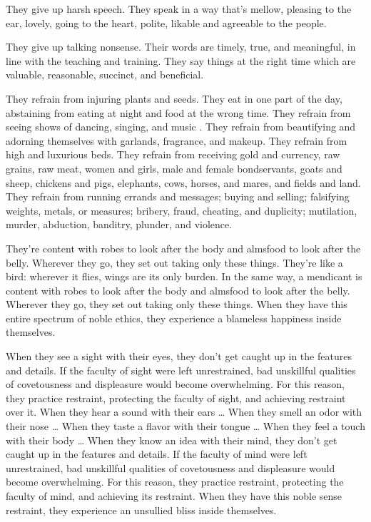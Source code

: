 \documentclass[12pt,openany]{book}%
\begin{document}
They give up harsh speech. They speak in a way that’s mellow, pleasing to the ear, lovely, going to the heart, polite, likable and agreeable to the people. 

They give up talking nonsense. Their words are timely, true, and meaningful, in line with the teaching and training. They say things at the right time which are valuable, reasonable, succinct, and beneficial. 

They refrain from injuring plants and seeds. They eat in one part of the day, abstaining from eating at night and food at the wrong time. They refrain from seeing shows of dancing, singing, and music . They refrain from beautifying and adorning themselves with garlands, fragrance, and makeup. They refrain from high and luxurious beds. They refrain from receiving gold and currency, raw grains, raw meat, women and girls, male and female bondservants, goats and sheep, chickens and pigs, elephants, cows, horses, and mares, and fields and land. They refrain from running errands and messages; buying and selling; falsifying weights, metals, or measures; bribery, fraud, cheating, and duplicity; mutilation, murder, abduction, banditry, plunder, and violence. 

They’re content with robes to look after the body and almsfood to look after the belly. Wherever they go, they set out taking only these things. They’re like a bird: wherever it flies, wings are its only burden. In the same way, a mendicant is content with robes to look after the body and almsfood to look after the belly. Wherever they go, they set out taking only these things. When they have this entire spectrum of noble ethics, they experience a blameless happiness inside themselves. 

When they see a sight with their eyes, they don’t get caught up in the features and details. If the faculty of sight were left unrestrained, bad unskillful qualities of covetousness and displeasure would become overwhelming. For this reason, they practice restraint, protecting the faculty of sight, and achieving restraint over it. When they hear a sound with their ears … When they smell an odor with their nose … When they taste a flavor with their tongue … When they feel a touch with their body … When they know an idea with their mind, they don’t get caught up in the features and details. If the faculty of mind were left unrestrained, bad unskillful qualities of covetousness and displeasure would become overwhelming. For this reason, they practice restraint, protecting the faculty of mind, and achieving its restraint. When they have this noble sense restraint, they experience an unsullied bliss inside themselves. 
\end{document}
